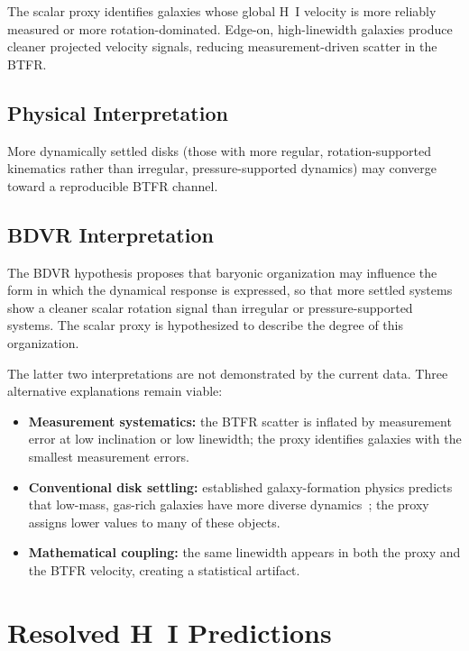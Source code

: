 \documentclass[11pt]{article}
\begin{document}
The scalar proxy identifies galaxies whose global H~I velocity is more reliably measured or more rotation-dominated. Edge-on, high-linewidth galaxies produce cleaner projected velocity signals, reducing measurement-driven scatter in the BTFR.

\subsection{Physical Interpretation}

More dynamically settled disks (those with more regular, rotation-supported kinematics rather than irregular, pressure-supported dynamics) may converge toward a reproducible BTFR channel.

\subsection{BDVR Interpretation}

The BDVR hypothesis proposes that baryonic organization may influence the form in which the dynamical response is expressed, so that more settled systems show a cleaner scalar rotation signal than irregular or pressure-supported systems. The scalar proxy is hypothesized to describe the degree of this organization.

The latter two interpretations are not demonstrated by the current data. Three alternative explanations remain viable:

\begin{itemize}
\item \textbf{Measurement systematics:} the BTFR scatter is inflated by measurement error at low inclination or low linewidth; the proxy identifies galaxies with the smallest measurement errors.
\item \textbf{Conventional disk settling:} established galaxy-formation physics predicts that low-mass, gas-rich galaxies have more diverse dynamics~\cite{navarro1997, mo1998}; the proxy assigns lower values to many of these objects.
\item \textbf{Mathematical coupling:} the same linewidth appears in both the proxy and the BTFR velocity, creating a statistical artifact.
\end{itemize}

\section{Resolved H~I Predictions}
\label{sec:resolved_predictions}
\end{document}
